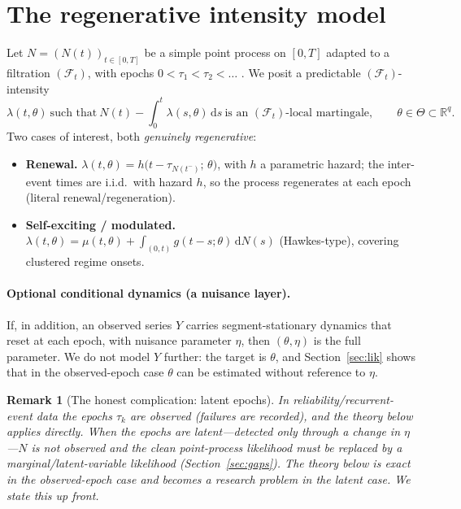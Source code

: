 \documentclass[11pt]{article}
\newtheorem{remark}{Remark}
\newcommand{\dd}{\,\mathrm{d}}
\newcommand{\R}{\mathbb{R}}
\newcommand{\F}{\mathcal{F}}
\begin{document}
\section{The regenerative intensity model}

Let $N=(N(t))_{t\in[0,T]}$ be a simple point process on $[0,T]$ adapted to a
filtration $(\F_t)$, with epochs $0<\tau_1<\tau_2<\dots$ . We posit a predictable
$(\F_t)$-intensity
\begin{equation}\label{eq:intensity}
\lambda(t,\theta)\ \text{such that}\
N(t)-\int_0^t \lambda(s,\theta)\dd s\ \text{is an $(\F_t)$-local martingale},
\qquad \theta\in\Theta\subset\R^q .
\end{equation}
Two cases of interest, both \emph{genuinely regenerative}:
\begin{itemize}
\item[(R)] \textbf{Renewal.} $\lambda(t,\theta)=h\!\big(t-\tau_{N(t^-)};\,\theta\big)$,
with $h$ a parametric hazard; the inter-event times are i.i.d.\ with hazard $h$,
so the process regenerates at each epoch (literal renewal/regeneration).
\item[(SE)] \textbf{Self-exciting / modulated.}
$\lambda(t,\theta)=\mu(t,\theta)+\int_{(0,t)} g(t-s;\theta)\dd N(s)$ (Hawkes-type),
covering clustered regime onsets.
\end{itemize}

\paragraph{Optional conditional dynamics (a nuisance layer).}
If, in addition, an observed series $Y$ carries segment-stationary dynamics that
reset at each epoch, with nuisance parameter $\eta$, then $(\theta,\eta)$ is the
full parameter. We do not model $Y$ further: the target is $\theta$, and
Section~\ref{sec:lik} shows that in the observed-epoch case $\theta$ can be
estimated without reference to $\eta$.

\begin{remark}[The honest complication: latent epochs]\label{rem:latent}
In reliability/recurrent-event data the epochs $\tau_k$ are \emph{observed}
(failures are recorded), and the theory below applies directly. When the epochs are
\emph{latent}---detected only through a change in $\eta$---$N$ is not observed and
the clean point-process likelihood must be replaced by a marginal/latent-variable
likelihood (Section~\ref{sec:gaps}). The theory below is exact in the
observed-epoch case and becomes a research problem in the latent case. We state
this up front.
\end{remark}
\end{document}
